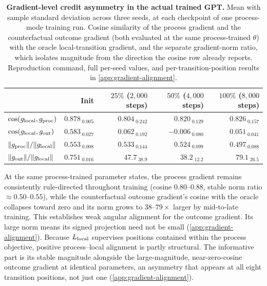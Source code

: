 \begin{table}[t]
\centering
\small
\begin{tabular}{lrrrr}
\toprule
& Init & $25\%$ ($2{,}000$ steps) & $50\%$ ($4{,}000$ steps) & $100\%$ ($8{,}000$ steps)\\
\midrule
$\cos(g_{\rm local},g_{\rm proc})$ & $0.878_{\;0.005}$ & $0.804_{\;0.242}$ & $0.820_{\;0.129}$ & $0.826_{\;0.157}$\\
$\cos(g_{\rm local},g_{\rm out})$ & $0.583_{\;0.027}$ & $0.062_{\;0.192}$ & $-0.006_{\;0.080}$ & $0.051_{\;0.041}$\\
\midrule
$\|g_{\rm proc}\|/\|g_{\rm local}\|$ & $0.553_{\;0.008}$ & $0.533_{\;0.144}$ & $0.524_{\;0.099}$ & $0.497_{\;0.088}$\\
$\|g_{\rm out}\|/\|g_{\rm local}\|$ & $0.751_{\;0.016}$ & $47.7_{\;38.9}$ & $38.2_{\;12.2}$ & $79.1_{\;26.5}$\\
\bottomrule
\end{tabular}
\caption{\textbf{Gradient-level credit asymmetry in the actual trained GPT.}
Mean with sample standard deviation across three seeds, at each checkpoint
of one process-mode training run. Cosine similarity of the process gradient
and the counterfactual outcome gradient (both evaluated at the same
process-trained $\theta$) with the oracle local-transition gradient, and
the separate gradient-norm ratio, which isolates magnitude from the
direction the cosine row already reports. Reproduction command, full
per-seed values, and per-transition-position results in
\cref{app:gradient-alignment}.}
\label{tab:gradient-alignment}
\end{table}

At the same process-trained parameter states, the process gradient
remains consistently rule-directed throughout training (cosine
$0.80$--$0.88$, stable norm ratio $\approx0.50$--$0.55$), while the
counterfactual outcome gradient's cosine with the oracle collapses
toward zero and its norm grows to $38$--$79\times$ larger by
mid-to-late training. This establishes weak angular alignment for the
outcome gradient. Its large norm means its signed projection need not be
small (\cref{app:gradient-alignment}).
Because $L_{\rm local}$ supervises positions contained within the process
objective, positive process--local alignment is partly structural. The
informative part is its stable magnitude alongside the large-magnitude,
near-zero-cosine outcome gradient at identical parameters, an asymmetry
that appears at all eight transition positions, not just one
(\cref{app:gradient-alignment}).


